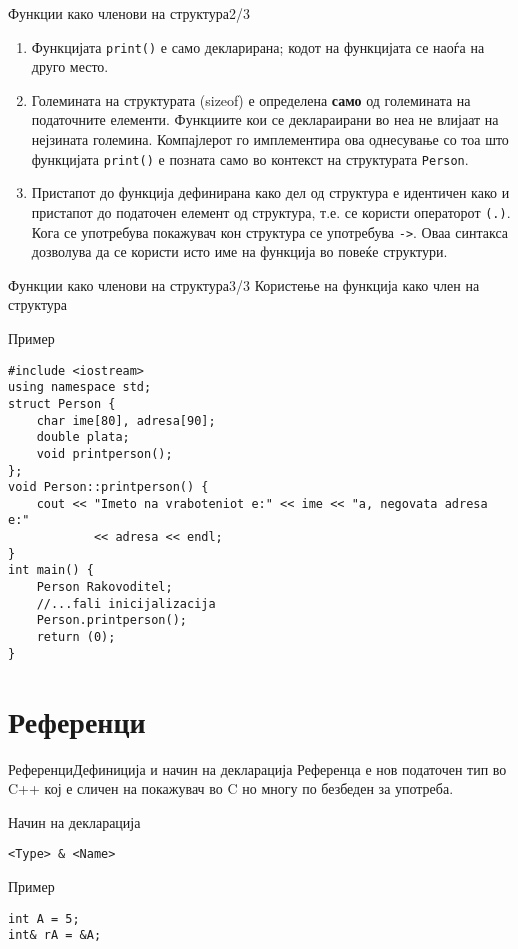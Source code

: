 \begin{frame}{Функции како членови на структура}{2/3}
\begin{enumerate}
  \item Функцијата \texttt{print()} е само декларирана; кодот на функцијата се наоѓа на друго
место.
    \item Големината на структурата (sizeof) е определена \textbf{само} од големината на
податочните елементи. Функциите кои се деклараирани во неа не влијаат на
нејзината големина. Компајлерот го имплементира ова однесување со тоа што
функцијата \texttt{print()} е позната само во контекст на структурата \texttt{Person}.
\item  Пристапот до функција дефинирана како дел од структура е идентичен како и
пристапот до податочен елемент од структура, т.е. се користи операторот \texttt{(.)}.
Кога се употребува покажувач кон структура се употребува \texttt{->}. Оваа синтакса
дозволува да се користи исто име на функција во повеќе структури.
\end{enumerate}
\end{frame}

\begin{frame}[fragile]{Функции како членови на структура}{3/3}
Користење на функција како член на структура
\begin{exampleblock}{Пример}
\begin{lstlisting}
#include <iostream>
using namespace std;
struct Person {
    char ime[80], adresa[90];
    double plata;
    void printperson();
};
void Person::printperson() {
    cout << "Imeto na vraboteniot e:" << ime << "a, negovata adresa e:"
            << adresa << endl;
}
int main() {
    Person Rakovoditel;
    //...fali inicijalizacija
    Person.printperson();
    return (0);
}
\end{lstlisting}
\end{exampleblock}
\end{frame}

\section{Референци}

\begin{frame}[fragile]{Референци}{Дефиниција и начин на декларација}
Референца е нов податочен тип во C++ кој е сличен на покажувач во C но многу по
безбеден за употреба.
\begin{exampleblock}{Начин на декларација}
\begin{lstlisting}
<Type> & <Name>
\end{lstlisting}
\end{exampleblock}

\begin{exampleblock}{Пример}
\begin{lstlisting}
int A = 5;
int& rA = &A;
\end{lstlisting}
\end{exampleblock}
\end{frame}

